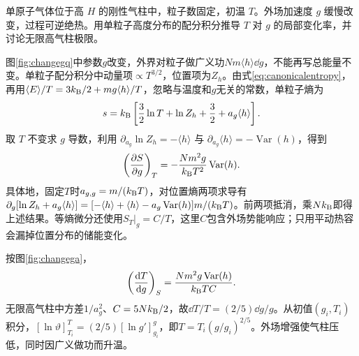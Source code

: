 \begin{exercise}[有限气柱的绝热外场变化（选做）]
单原子气体位于高 $H$ 的刚性气柱中，粒子数固定，初温 $T$。外场加速度 $g$ 缓慢改变，过程可逆绝热。用单粒子高度分布的配分积分推导 $T$ 对 $g$ 的局部变化率，并讨论无限高气柱极限。
\end{exercise}
\begin{solution}
图\ref{fig:changegq}中参数$g$改变，外界对粒子做广义功$Nm\langle h\rangle\dd g$，不能再写总能量不变。单粒子配分积分中动量项$\propto T^{3/2}$，位置项为$Z_h$。由式\eqref{eq:canonicalentropy}，再用$\langle E\rangle/T=3k_{\mathrm B}/2+mg\langle h\rangle/T$，忽略与温度和$g$无关的常数，单粒子熵为
\[
 s=k_{\mathrm B}\left[\frac32\ln T+\ln Z_h+\frac32+a_g\langle h\rangle\right].
\]
取 $T$ 不变求 $g$ 导数，利用 $\partial_{a_g}\ln Z_h=-\langle h\rangle$ 与 $\partial_{a_g}\langle h\rangle=-\operatorname{Var}(h)$，得到
\[
 \left(\frac{\partial S}{\partial g}\right)_T
 =-\frac{Nm^2g}{k_{\mathrm B} T^2}\operatorname{Var}(h).
\]
具体地，固定$T$时$a_{g,g}=m/(k_{\mathrm B} T)$，对位置熵两项求导有$\partial_g[\ln Z_h+a_g\langle h\rangle]=[-\langle h\rangle+\langle h\rangle-a_g\operatorname{Var}(h)]m/(k_{\mathrm B} T)$。前两项抵消，乘$Nk_{\mathrm B}$即得上述结果。等熵微分还使用$S_T|_g=C/T$，这里$C$包含外场势能响应；只用平动热容会漏掉位置分布的储能变化。

按图\ref{fig:changega}，
\[
 \left(\frac{\mathop{}\!\mathrm d T}{\mathop{}\!\mathrm d g}\right)_S
 =\frac{Nm^2g\operatorname{Var}(h)}{k_{\mathrm B} TC}.
\]
无限高气柱中方差$1/a_g^2$、$C=5Nk_{\mathrm B}/2$，故$\dd T/T=(2/5)\dd g/g$。从初值$(g_i,T_i)$积分，$[\ln\vartheta]_{T_i}^{T}=(2/5)[\ln g']_{g_i}^{g}$，即$T=T_i(g/g_i)^{2/5}$。外场增强使气柱压低，同时因广义做功而升温。
\end{solution}

